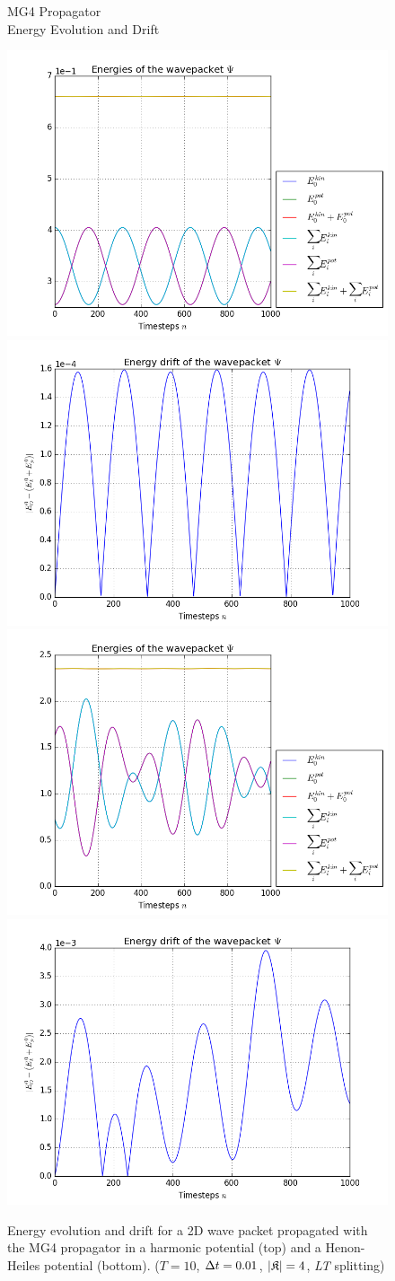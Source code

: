 \begin{figure}[ht]
	\centering
	\begin{minipage}[c]{\textwidth}
		\begin{center}
			\large MG4 Propagator \\[1mm]
			\normalsize Energy Evolution and Drift
			\vspace{4mm}
		\end{center}
	\end{minipage}
	\includegraphics[width=.45\textwidth]{figures/harmonic_energies_MG4.png}
	\includegraphics[width=.45\textwidth]{figures/harmonic_drift_MG4.png} \\
	\includegraphics[width=.45\textwidth]{figures/henon_energies_MG4.png}
	\includegraphics[width=.45\textwidth]{figures/henon_drift_MG4.png}
	\caption{Energy evolution and drift for a 2D wave packet propagated with the MG4 propagator in a harmonic potential (top) and a Henon-Heiles potential (bottom).
	($T = 10$, $\Delta t = 0.01$, $| \mathfrak{K} | = 4$, \emph{LT} splitting)}
	\label{fig:energy_MG4}
\end{figure}

